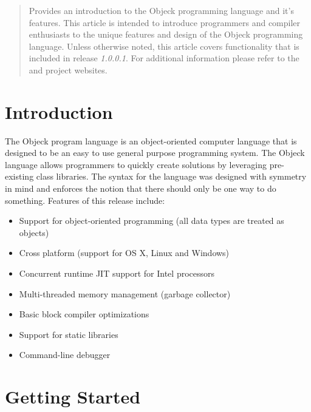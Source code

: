 \documentclass[12pt]{article}
\begin{document}
\maketitle
\thispagestyle{empty}

\vspace{\baselineskip}

\begin{abstract}
Provides an introduction to the Objeck programming language and it's features.  This article is intended to introduce programmers and compiler enthusiasts to the unique features and design of the Objeck programming language.   Unless otherwise noted, this article covers functionality that is included in release \textit{1.0.0.1}.  For additional information please refer to the  and  project websites.
\end{abstract}

\newpage
\tableofcontents
\newpage

\label{Introduction}
\section{Introduction}
The Objeck program language is an object-oriented computer language that is designed to be an easy to use general purpose programming system.  The Objeck language allows programmers to quickly create solutions by leveraging pre-existing class libraries.  The syntax for the language was designed with symmetry in mind and enforces the notion that there should only be one way to do something. Features of this release include:
\begin{itemize}
	\item Support for object-oriented programming (all data types are treated as objects)
	\item Cross platform (support for OS X, Linux and Windows)
	\item Concurrent runtime JIT support for Intel processors
	\item Multi-threaded memory management (garbage collector)
	\item Basic block compiler optimizations
	\item Support for static libraries
	\item Command-line debugger
\end{itemize}

\section{Getting Started}
\end{document}
